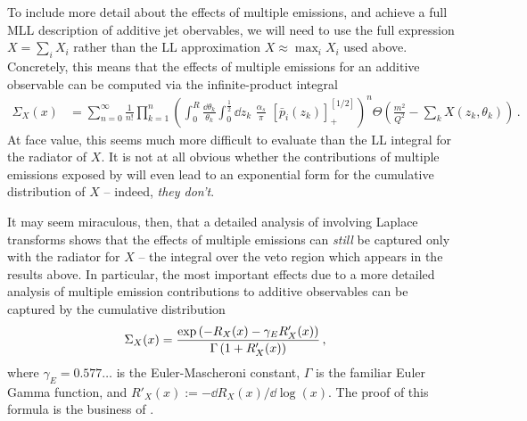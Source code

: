 To include more detail about the effects of multiple emissions, and achieve a full MLL description of additive jet obervables, we will need to use the full expression \(X = \sum_i X_i\) rather than the LL approximation \(X \approx \max_i X_i\) used above.
%
Concretely, this means that the effects of multiple emissions for an additive observable can be computed via the infinite-product integral
\begin{align}
    \label{eq:series-multiple-emissions}
    \Sigma_X(x)
    &=
    \sum_{n = 0}^{\infty}
    \frac{1}{n!}
    \prod_{k = 1}^n
    \left(
        \int_0^R \frac{\dd\theta_k}{\theta_k}
        \int_0^{\frac{1}{2}} \dd z_k
        \,\,
        \frac{\alpha_s}{\pi}
        \,\,
        [\bar{p}_i(z_k)]_+^{[1/2]}
    \right)^n
    \Theta\left(
        \frac{m^2}{Q^2} - \sum_k X(z_k, \theta_k)
    \right)
    \,.
\end{align}
%
At face value, this seems much more difficult to evaluate than the LL integral for the radiator of \(X\).
%
It is not at all obvious whether the contributions of multiple emissions exposed by  will even lead to an exponential form for the cumulative distribution of \(X\) --
indeed, \textit{they don't}.

It may seem miraculous, then, that a detailed analysis of  involving Laplace transforms shows that the effects of multiple emissions can \textit{still} be captured only with the radiator for \(X\) -- the integral over the veto region which appears in the  results above.
%
In particular, the most important effects due to a more detailed analysis of multiple emission contributions to additive observables can be captured by the cumulative distribution
\begin{align}
    \label{eq:resummed-multiple-emissions}
    \Sigma_X(x)
    &=
    \frac{\exp\le(-R_X(x) - \gamma_E R'_X(x)\ri)}{\Gamma\le(1 + R'_X(x)\ri)}
    \,,
\end{align}
where \(\gamma_E=0.577\dots\) is the Euler-Mascheroni constant, \(\Gamma\) is the familiar Euler Gamma function, and \(R'_X(x) := -\dd R_X(x) / \dd \log(x)\).
%
The proof of this formula is the business of .



